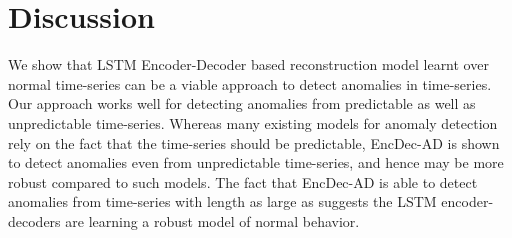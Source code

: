 \documentclass{article}
\begin{document}
\section{Discussion}
We show that LSTM Encoder-Decoder based reconstruction model learnt over normal time-series can be a viable approach to detect anomalies in time-series. Our approach works well for detecting anomalies from predictable as well as unpredictable time-series. Whereas many existing models for anomaly detection rely on the fact that the time-series should be predictable, EncDec-AD is shown to detect anomalies even from unpredictable time-series, and hence may be more robust compared to such models. 
The fact that EncDec-AD is able to detect anomalies from time-series with length as large as  suggests the LSTM encoder-decoders are  learning a robust model of normal behavior.



\end{document}
